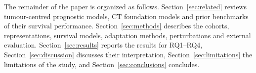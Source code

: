 The remainder of the paper is organized as follows. Section~\ref{sec:related} reviews tumour-centred prognostic models, CT foundation models and prior benchmarks of their survival performance. Section~\ref{sec:methods} describes the cohorts, representations, survival models, adaptation methods, perturbations and external evaluation. Section~\ref{sec:results} reports the results for RQ1--RQ4, Section~\ref{sec:discussion} discusses their interpretation, Section~\ref{sec:limitations} the limitations of the study, and Section~\ref{sec:conclusions} concludes.

